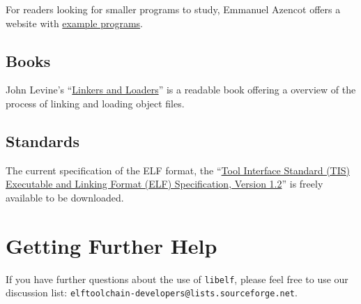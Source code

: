 \documentclass[a4paper,pdftex]{book}
\newcommand{\library}[1]{\texttt{#1}}
\begin{document}
For readers looking for smaller programs to study, Emmanuel Azencot
offers a website with
\href{http://freemanu1.free.fr/elf_examples/index.html}{example
  programs}.

\subsection{Books}

John Levine's
``\href{https://linker.iecc.com/}{Linkers and Loaders}'' is a readable
book offering a overview of the process of linking and loading object
files.

\subsection{Standards}

The current specification of the ELF
format, the ``\href{https://refspecs.linuxbase.org/elf/elf.pdf}%
{Tool Interface Standard (TIS) Executable and Linking Format
(ELF) Specification, Version 1.2}'' is freely available to be
downloaded.

\section{Getting Further Help}

If you have further questions about
the use of \library{libelf}, please feel free to use our discussion
list: \texttt{elftoolchain-\-developers@lists.sourceforge.net}.

\backmatter

\printindex
\end{document}
